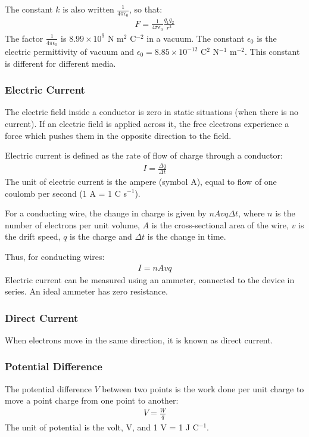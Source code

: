 The constant $k$ is also written $\frac{1}{4\pi\epsilon_0}$, so that:
\begin{align*}
    F = \frac{1}{4\pi\epsilon_0} \frac{q_1q_2}{r^2}
\end{align*}
The factor $\frac{1}{4\pi\epsilon_0}$ is $8.99 \times 10^9$ N m$^2$ C$^{-2}$ in
a vacuum. The constant $\epsilon_0$ is the electric permittivity of vacuum and
$\epsilon_0 = 8.85 \times 10^{-12}$ C${^2}$ N$^{-1}$ m$^{-2}$. This constant
is different for different media.

\subsubsection{Electric Current}
The electric field inside a conductor is zero in static situations (when there
is no current). If an electric field is applied across it, the free electrons
experience a force which pushes them in the opposite direction to the field.

Electric current is defined as the rate of flow of charge through a conductor:
\begin{align*}
    I = \frac{\Delta q}{\Delta t}
\end{align*}
The unit of electric current is the ampere (symbol A), equal to flow of one
coulomb per second (1 A = 1 C s$^{-1}$).

For a conducting wire, the change in charge is given by $nAvq\Delta t$, where
$n$ is the number of electrons per unit volume, $A$ is the cross-sectional
area of the wire, $v$ is the drift speed, $q$ is the charge and $\Delta t$ is
the change in time.

Thus, for conducting wires:
\begin{align*}
    I = nAvq
\end{align*}
Electric current can be measured using an ammeter, connected to the device in
series. An ideal ammeter has zero resistance.

\subsubsection{Direct Current}
When electrons move in the same direction, it is known as direct current.

\subsubsection{Potential Difference}
The potential difference $V$ between two points is the work done per unit
charge to move a point charge from one point to another:
\begin{align*}
    V = \frac{W}{q}
\end{align*}
The unit of potential is the volt, V, and 1 V = 1 J C$^{-1}$.


